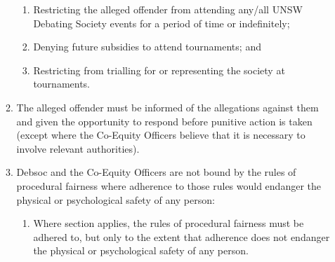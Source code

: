 \begin{enumerate}
\begin{enumerate}
    \begin{enumerate}
    \item Restricting the alleged offender from attending any/all UNSW Debating Society events for a period of time or indefinitely;
    \item Denying future subsidies to attend tournaments; and
    \item Restricting from trialling for or representing the society at tournaments.
    \end{enumerate}
  \item The alleged offender must be informed of the allegations against them and given the opportunity to respond before punitive action is taken (except where the Co-Equity Officers believe that it is necessary to involve relevant authorities).
  \item Debsoc and the Co-Equity Officers are not bound by the rules of procedural fairness where adherence to those rules would endanger the physical or psychological safety of any person: \label{procedural_fairness}
    \begin{enumerate}
    \item Where section  applies, the rules of procedural fairness must be adhered to, but only to the extent that adherence does not endanger the physical or psychological safety of any person.
    \end{enumerate}
  \end{enumerate}
\end{enumerate}

